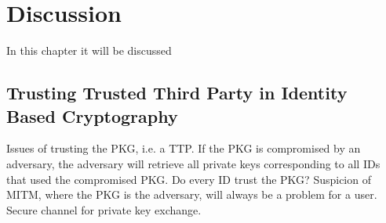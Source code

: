 \chapter{Discussion}
In this chapter it will be discussed 

\section{Trusting Trusted Third Party in Identity Based Cryptography}
Issues of trusting the \gls{PKG}, i.e. a \gls{TTP}. 
If the \gls{PKG} is compromised by an adversary, the adversary will retrieve all private keys corresponding to all IDs that used the compromised \gls{PKG}. 
Do every ID trust the \gls{PKG}? Suspicion of \gls{MITM}, where the \gls{PKG} is the adversary, will always be a problem for a user.
Secure channel for private key exchange. 
